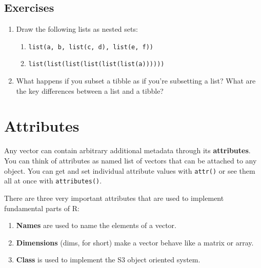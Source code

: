 \documentclass[]{book}
\newenvironment{Shaded}{\begin{snugshade}}{\end{snugshade}}
\newcommand{\KeywordTok}[1]{\textcolor[rgb]{0.13,0.29,0.53}{\textbf{{#1}}}}
\newcommand{\DecValTok}[1]{\textcolor[rgb]{0.00,0.00,0.81}{{#1}}}
\newcommand{\StringTok}[1]{\textcolor[rgb]{0.31,0.60,0.02}{{#1}}}
\newcommand{\CommentTok}[1]{\textcolor[rgb]{0.56,0.35,0.01}{\textit{{#1}}}}
\newcommand{\NormalTok}[1]{{#1}}
\providecommand{\tightlist}{%
  \setlength{\itemsep}{0pt}\setlength{\parskip}{0pt}}
\begin{document}
\subsection{Exercises}\label{exercises-53}

\begin{enumerate}
\def\labelenumi{\arabic{enumi}.}
\item
  Draw the following lists as nested sets:

  \begin{enumerate}
  \def\labelenumii{\arabic{enumii}.}
  \tightlist
  \item
    \texttt{list(a,\ b,\ list(c,\ d),\ list(e,\ f))}
  \item
    \texttt{list(list(list(list(list(list(a))))))}
  \end{enumerate}
\item
  What happens if you subset a tibble as if you're subsetting a list?
  What are the key differences between a list and a tibble?
\end{enumerate}

\section{Attributes}\label{attributes}

Any vector can contain arbitrary additional metadata through its
\textbf{attributes}. You can think of attributes as named list of
vectors that can be attached to any object. You can get and set
individual attribute values with \texttt{attr()} or see them all at once
with \texttt{attributes()}.

\begin{Shaded}
\end{Shaded}

There are three very important attributes that are used to implement
fundamental parts of R:

\begin{enumerate}
\def\labelenumi{\arabic{enumi}.}
\tightlist
\item
  \textbf{Names} are used to name the elements of a vector.
\item
  \textbf{Dimensions} (dims, for short) make a vector behave like a
  matrix or array.
\item
  \textbf{Class} is used to implement the S3 object oriented system.
\end{enumerate}
\end{document}
